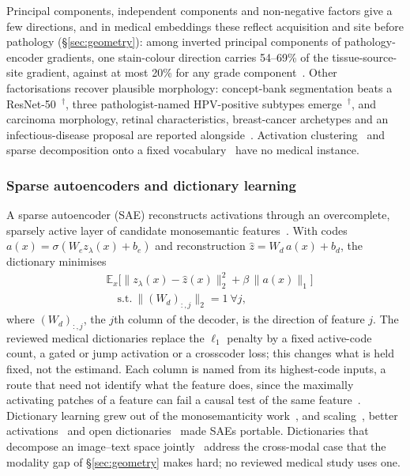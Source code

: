 Principal components, independent components and non-negative factors give a few directions, and in
medical embeddings these reflect acquisition and site before pathology (\S\ref{sec:geometry}): among
inverted principal components of pathology-encoder gradients, one stain-colour direction carries
54--69\% of the tissue-source-site gradient, against at most 20\% for any grade
component~\cite{howard2024generative}. Other factorisations recover plausible morphology: concept-bank segmentation beats a
ResNet-50~\cite{gildenblat2024segmentation}$^{\dagger}$, three pathologist-named HPV-positive subtypes
emerge~\cite{hieromnimon2025analysis}$^{\dagger}$, and carcinoma morphology, retinal characteristics,
breast-cancer archetypes and an infectious-disease proposal are reported
alongside~\cite{qin2026clearhpv,varshney2024generating,beyeler2024comparing,fournier2026prognostic,sizikova2022automatic}.
Activation clustering~\cite{ghorbani2019automating,fel2023a} and sparse decomposition onto a fixed
vocabulary~\cite{bhalla2024interpreting} have no medical instance.

\subsubsection{Sparse autoencoders and dictionary learning}

A sparse autoencoder (SAE) reconstructs activations through an overcomplete, sparsely active layer of
candidate monosemantic features~\cite{cunningham2023sparse}. With codes
$a(x)=\sigma(W_e z_\lambda(x)+b_e)$ and reconstruction $\hat z=W_d\,a(x)+b_d$, the dictionary
minimises
\begin{equation}
\begin{split}
&\mathbb{E}_x\big[\|z_\lambda(x)-\hat z(x)\|_2^{2}+\beta\,\|a(x)\|_1\big]\\
&\quad\text{s.t.}\ \|(W_d)_{:,j}\|_2=1\ \forall j,
\end{split}
\label{eq:sae}
\end{equation}
where $(W_d)_{:,j}$, the $j$th column of the decoder, is the direction of feature $j$. The reviewed
medical dictionaries replace the $\ell_1$ penalty by a fixed active-code count, a gated or jump
activation or a crosscoder loss; this changes what is held fixed, not the estimand. Each column is
named from its highest-code inputs, a route that need not identify what the feature does, since the
maximally activating patches of a feature can fail a causal test of the same
feature~\cite{han2025causal}. Dictionary learning grew out of the monosemanticity
work~\cite{bricken2023monosemanticity,templeton2026scaling}, and scaling~\cite{gao2024scaling}, better
activations~\cite{rajamanoharan2024jumping} and open dictionaries~\cite{lieberum2024gemma} made SAEs
portable. Dictionaries that decompose an image--text space
jointly~\cite{kaushik2026decomposing,gordon2026scocca} address the cross-modal case that the modality
gap of \S\ref{sec:geometry} makes hard; no reviewed medical study uses one.


